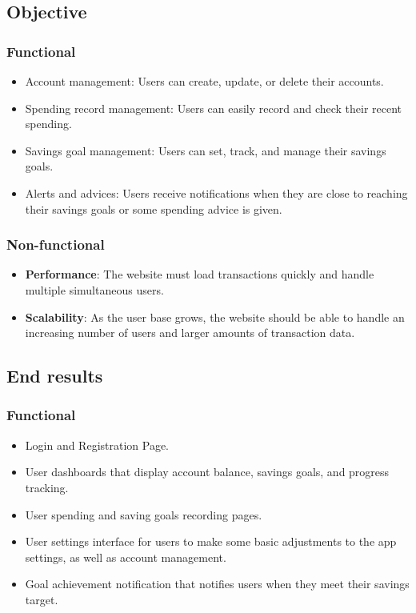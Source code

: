 \documentclass{article}
\begin{document}
\subsection{Objective}
\subsubsection{Functional}
\begin{itemize}
    \item Account management: Users can create, update, or delete their accounts.
    \item Spending record management: Users can easily record and check their recent spending.
    \item Savings goal management: Users can set, track, and manage their savings goals.
    \item Alerts and advices: Users receive notifications when they are close to reaching their savings goals or some spending advice is given.
\end{itemize}
\subsubsection{Non-functional}
\begin{itemize}
    \item \textbf{Performance}: The website must load transactions quickly and handle multiple simultaneous users.
    \item \textbf{Scalability}: As the user base grows, the website should be able to handle an increasing number of users and larger amounts of transaction data.
\end{itemize}
\subsection{End results}
\subsubsection{Functional}
\begin{itemize}
    \item Login and Registration Page.
    \item User dashboards that display account balance, savings goals, and progress tracking.
    \item User spending and saving goals recording pages.
    \item User settings interface for users to make some basic adjustments to the app settings, as well as account management.
    \item Goal achievement notification that notifies users when they meet their savings target.
\end{itemize}
\end{document}
